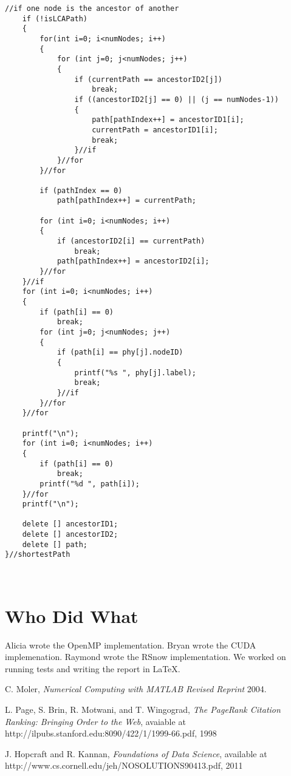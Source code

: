 \documentclass[11pt,letterpaper]{article}
\begin{document}
\begin{lstlisting}[style=MyC++Style]
	//if one node is the ancestor of another
    if (!isLCAPath)
    {
        for(int i=0; i<numNodes; i++)
        {
            for (int j=0; j<numNodes; j++)
            {
                if (currentPath == ancestorID2[j])
                    break;
                if ((ancestorID2[j] == 0) || (j == numNodes-1))
                {
                    path[pathIndex++] = ancestorID1[i];
                    currentPath = ancestorID1[i];
                    break;
                }//if
            }//for  
        }//for      

        if (pathIndex == 0)
            path[pathIndex++] = currentPath;

        for (int i=0; i<numNodes; i++)
        {
            if (ancestorID2[i] == currentPath)
                break;
            path[pathIndex++] = ancestorID2[i];
        }//for
    }//if
    for (int i=0; i<numNodes; i++)
    {
        if (path[i] == 0)
            break;
        for (int j=0; j<numNodes; j++)
        {
            if (path[i] == phy[j].nodeID)
            {
                printf("%s ", phy[j].label);
                break;
            }//if
        }//for
    }//for

    printf("\n");
    for (int i=0; i<numNodes; i++)
    {
        if (path[i] == 0)
            break;
        printf("%d ", path[i]);
    }//for
    printf("\n");

    delete [] ancestorID1;
    delete [] ancestorID2;
    delete [] path;
}//shortestPath



\end{lstlisting}

\section{Who Did What} \label{App:AppendixB}

Alicia wrote the OpenMP implementation. Bryan wrote the CUDA implemenation. Raymond wrote the RSnow implementation. We worked on running tests and writing the report in  \LaTeX.

\newpage

\begin{thebibliography}{1}

   C. Moler, {\em Numerical Computing with MATLAB Revised Reprint}  2004.

    L. Page, S. Brin, R. Motwani, and T. Wingograd, {\em The PageRank Citation Ranking: Bringing Order to the Web}, avaiable at http://ilpubs.stanford.edu:8090/422/1/1999-66.pdf,	1998

    J. Hopcraft and R. Kannan, {\em Foundations of Data Science}, available at http://www.cs.cornell.edu/jeh/NOSOLUTIONS90413.pdf, 2011

\end{thebibliography}
\end{document}
